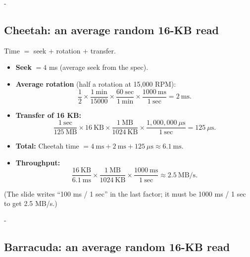 \documentclass[11pt,a4paper]{article}
\makeatletter
\newcommand{\keepspace}[1]{\par\penalty-100\begingroup
  \setlength{\dimen@}{#1}\dimen@ii\pagegoal\advance\dimen@ii-\pagetotal
  \ifdim\dimen@>\dimen@ii\ifdim\dimen@ii>\z@\vfil\fi\break\fi\endgroup}
\makeatother
\begin{document}
\keepspace{18\baselineskip}
\subsection{Cheetah: an average random 16-KB read}

\begin{solbox}
Time \(=\) seek \(+\) rotation \(+\) transfer.
\begin{itemize}
  \item \textbf{Seek} \(= 4\) ms (average seek from the spec).
  \item \textbf{Average rotation} (half a rotation at 15,000 RPM):
  \[
    \frac12 \times \frac{1\ \text{min}}{15000} \times \frac{60\ \text{sec}}{1\ \text{min}}
    \times \frac{1000\ \text{ms}}{1\ \text{sec}} = 2\ \text{ms}.
  \]
  \item \textbf{Transfer of 16 KB:}
  \[
    \frac{1\ \text{sec}}{125\ \text{MB}} \times 16\ \text{KB} \times
    \frac{1\ \text{MB}}{1024\ \text{KB}} \times
    \frac{1{,}000{,}000\ \mu\text{s}}{1\ \text{sec}} = 125\ \mu\text{s}.
  \]
  \item \textbf{Total:} Cheetah time \(= 4\ \text{ms} + 2\ \text{ms} +
        125\ \mu\text{s} \approx 6.1\ \text{ms}\).
  \item \textbf{Throughput:}
  \[
    \frac{16\ \text{KB}}{6.1\ \text{ms}} \times \frac{1\ \text{MB}}{1024\ \text{KB}}
    \times \frac{1000\ \text{ms}}{1\ \text{sec}} \approx 2.5\ \text{MB/s}.
  \]
\end{itemize}
{\small (The slide writes ``100 ms / 1 sec'' in the last factor; it must be
1000 ms / 1 sec to get 2.5 MB/s.)}
\end{solbox}

\keepspace{18\baselineskip}
\subsection{Barracuda: an average random 16-KB read}
\end{document}
